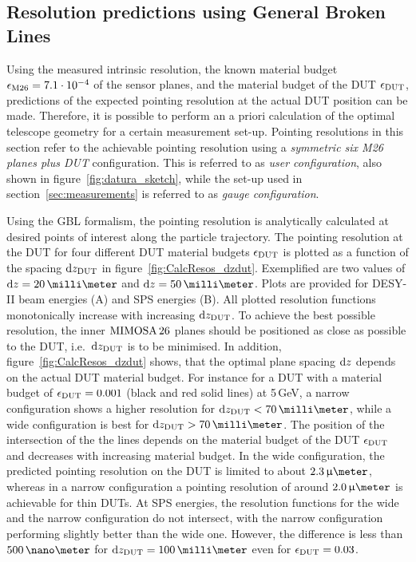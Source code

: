 \subsection{Resolution predictions using General Broken Lines}

Using the measured intrinsic resolution, the known material budget $\mathnormal{\epsilon_{\textrm{M26}}} = 7.1\cdot 10^{-4}$ of the sensor planes, and the material budget of the DUT $\mathnormal{\epsilon_{\textrm{DUT}}}$,
 predictions of the expected pointing resolution at the actual DUT position can be made. 
Therefore, it is possible to perform an a priori calculation of the optimal telescope geometry for a certain measurement set-up. 
Pointing resolutions in this section refer to the achievable pointing resolution using a \textit{symmetric six M26 planes plus DUT} configuration. 
This is referred to as \textit{user configuration}, also shown in figure~\ref{fig:datura_sketch}, while the set-up used in section~\ref{sec:measurements} is referred to as \textit{gauge configuration}. 

Using the GBL formalism, the pointing resolution is analytically calculated at desired points of interest along the particle trajectory. 
The pointing resolution at the DUT for four different DUT material budgets $\mathnormal{\epsilon_{\textrm{DUT}}}$ is plotted as a function of the spacing $\textrm{d}z_{\textrm{DUT}}$ in figure~\ref{fig:CalcResos_dzdut}.
Exemplified are two values of $\dz = 20\,\milli\meter$ and $\dz = 50\,\milli\meter$. 
Plots are provided for DESY-II beam energies (A) and SPS energies (B). 
All plotted resolution functions monotonically increase with increasing $\textrm{d}z_{\textrm{DUT}}$. 
To achieve the best possible resolution, the inner $\textrm{MIMOSA\,26}$ planes should be positioned as close as possible to the DUT, i.e.~$\textrm{d}z_{\textrm{DUT}}$ is to be minimised. 
In addition, figure~\ref{fig:CalcResos_dzdut} shows, that the optimal plane spacing $\textrm{d}z$ depends on the actual DUT material budget.
For instance for a DUT with a material budget of $\mathnormal{\epsilon_{\textrm{DUT}}} = 0.001$ (black and red solid lines) at 5\,GeV, a narrow configuration shows a higher resolution for $\dzdut < 70\,\milli\meter$,
 while a wide configuration is best for $\dzdut > 70\,\milli\meter$.
The position of the intersection of the the lines depends on the material budget of the DUT $\mathnormal{\epsilon_{\textrm{DUT}}}$ and decreases with increasing material budget. 
In the wide configuration, the predicted pointing resolution on the DUT is limited to about $2.3\,\upmu\meter$,
 whereas in a narrow configuration a pointing resolution of around $2.0\,\upmu\meter$ is achievable for thin DUTs.
At SPS energies, the resolution functions for the wide and the narrow configuration do not intersect, with the narrow configuration performing slightly better than the wide one.
However, the difference is less than $500\,\nano\meter$ for $\dzdut = 100\,\milli\meter$ even for $\mathnormal{\epsilon_{\textrm{DUT}}} = 0.03$. 

